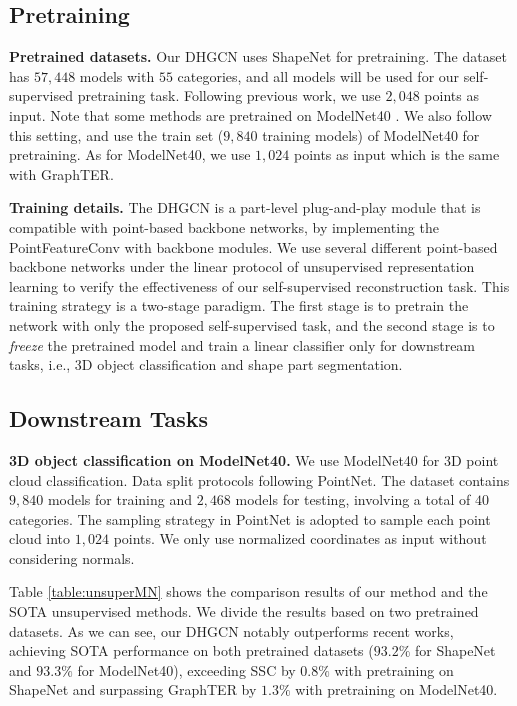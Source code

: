 \documentclass[letterpaper]{article} %
\begin{document}
\subsection{Pretraining}
\textbf{Pretrained datasets.}
Our DHGCN uses ShapeNet \cite{chang2015shapenet} for pretraining. The dataset has $57,448$ models with $55$ categories, and all models will be used for our self-supervised pretraining task. Following previous work, we use $2,048$ points as input. Note that some methods are pretrained on ModelNet40 \cite{wu20153d}. We also follow this setting, and use the train set ($9,840$ training models) of ModelNet40 for pretraining.
As for ModelNet40, we use $1,024$ points as input which is the same with GraphTER.


\textbf{Training details.}
The DHGCN is a part-level plug-and-play module that is compatible with point-based backbone networks, by implementing the PointFeatureConv with backbone modules.
We use several different point-based backbone networks under the linear protocol of unsupervised representation learning to verify the effectiveness of our self-supervised reconstruction task.
This training strategy is a two-stage paradigm. The first stage is to pretrain the network with only the proposed self-supervised task, and the second stage is to \textit{freeze} the pretrained model and train a linear classifier only for downstream tasks, i.e., 3D object classification and shape part segmentation.

\subsection{Downstream Tasks}

\textbf{3D object classification on ModelNet40.}
We use ModelNet40 for 3D point cloud classification.
Data split protocols following PointNet.
The dataset contains $9,840$ models for training and $2,468$ models for testing, involving a total of $40$ categories.
The sampling strategy in PointNet is adopted to sample each point cloud into $1,024$ points.
We only use normalized coordinates as input without considering normals.

Table \ref{table:unsuperMN} shows the comparison results of our method and the SOTA unsupervised methods.
We divide the results based on two pretrained datasets.
As we can see, our DHGCN notably outperforms recent works, achieving SOTA performance on both pretrained datasets ($93.2\%$ for ShapeNet and $93.3\%$ for ModelNet40), exceeding SSC by $0.8\%$ with pretraining on ShapeNet and surpassing GraphTER by $1.3\%$ with pretraining on ModelNet40.
\end{document}
